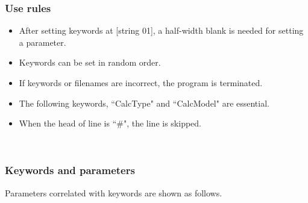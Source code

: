 \subsubsection{Use rules}
\begin{itemize}
\item After setting keywords at [string 01], a half-width blank is needed for setting a parameter.
\item Keywords can be set in random order.
\item If keywords or filenames are incorrect, the program is terminated. 
\item The following keywords, ``CalcType" and ``CalcModel" are essential. 
\item When the head of line is ``$\#$", the line is skipped.
\end{itemize}
~\subsubsection{Keywords and parameters}
Parameters correlated with keywords are shown as follows.
